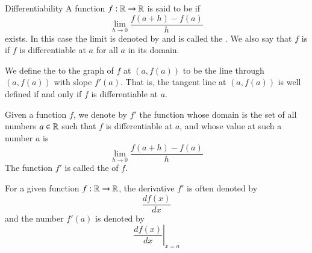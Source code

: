 \documentclass[12pt]{report}
\begin{document}
\begin{defn}{Differentiability}{}
    A function $f:\mathbb R\rightarrow \mathbb R$ is said to be  if \begin{equation}
        \lim\limits_{h\rightarrow 0}\frac{f(a+h) - f(a)}{h}
    \end{equation}
    exists. In this case the limit is denoted by  and is called the . We also say that $f$ is  if $f$ is differentiable at $a$ for all $a$ in its domain.
\end{defn}

\begin{defn}{}{}
    We define the  to the graph of $f$ at $(a,f(a))$ to be the line through $(a,f(a))$ with slope $f'(a)$. That is, the tangent line at $(a,f(a))$ is well defined if and only if $f$ is differentiable at $a$.
\end{defn}


\begin{rmk}{}{}
    Given a function $f$, we denote by $f'$ the function whose domain is the set of all numbers $a \in \mathbb R$ such that $f$ is differentiable at $a$, and whose value at such a number $a$ is \begin{equation}
        \lim\limits_{h\rightarrow 0}\frac{f(a+h) - f(a)}{h}
    \end{equation}
    The function $f'$ is called the  of $f$.
\end{rmk}

\begin{nota*}{}{}
    For a given function $f:\mathbb R\rightarrow \mathbb R$, the derivative $f'$ is often denoted by \begin{equation}
        \frac{df(x)}{dx}
    \end{equation}
    and the number $f'(a)$ is denoted by \begin{equation}
        \left.\frac{df(x)}{dx}\right\vert_{x=a}
    \end{equation}
\end{nota*}
\end{document}
